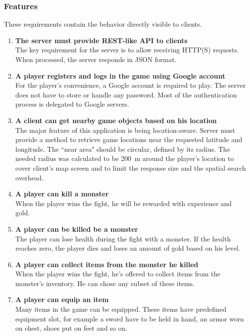 		\subsubsection*{Features}
		These requirements contain the behavior directly visible to clients.
		\begin{enumerate}
			\item \textbf{The server must provide REST-like API to clients} \\
			The key requirement for the server is to allow receiving HTTP(S) requests. When processed, the server responds in JSON format.
			
			\item \textbf{A player registers and logs in the game using Google account} \\
			For the player's convenience, a Google account is required to play. The server does not have to store or handle any password. Most of the authentication process is delegated to Google servers.
			
			\item \textbf{A client can get nearby game objects based on his location} \\
			The major feature of this application is being location-aware. Server must provide a method to retrieve game locations near the requested latitude and longitude. The ``near area" should be circular, defined by its radius. The needed radius was calculated to be 200~m around the player's location to cover client's map screen and to limit the response size and the spatial search overhead.
			
			\item \textbf{A player can kill a monster} \\
			When the player wins the fight, he will be rewarded with experience and gold. 			
			
			\item \textbf{A player can be killed be a monster} \\
			The player can lose health during the fight with a monster. If the health reaches zero, the player dies and loses an amount of gold based on his level.
			
			\item \textbf{A player can collect items from the monster he killed} \\
			When the player wins the fight, he's offered to collect items from the monster's inventory. He can chose any subset of these items.
			
			\item \textbf{A player can equip an item} \\	
			Many items in the game can be equipped. These items have predefined equipment slot, for example a sword have to be held in hand, an armor worn on chest, shoes put on feet and so on.
						

\end{enumerate}
